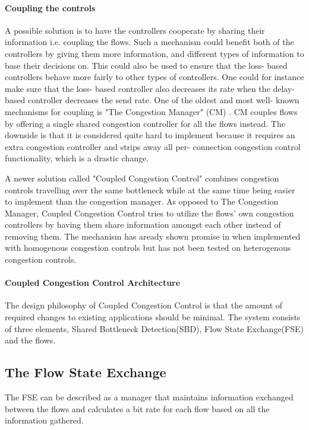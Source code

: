 \paragraph{Coupling the controls}
A possible solution is to have the controllers cooperate by sharing their information i.e. coupling the flows.
Such a mechanism could benefit both of the controllers by giving them more information, and different types of information to base their decisions on. 
This could also be used to ensure that the loss- based controllers behave more fairly to other types of controllers.
One could for instance make sure that the loss- based controller also decreases its rate when the delay- based controller decreases the send rate.
One of the oldest and most well- known mechanisms for coupling is "The Congestion Manager" (CM) \cite{rfc3124}.
CM couples flows by offering a single shared congestion controller for all the flows instead.
The downside is that it is considered quite hard to implement because it requires an extra congestion controller and strips away all per- connection congestion control functionality, which is a drastic change.

A newer solution called "Coupled Congestion Control" \cite{rfc8699} combines congestion controls travelling over the same bottleneck while at the same time being easier to implement than the congestion manager.
As opposed to The Congestion Manager, Coupled Congestion Control tries to utilize the flows' own congestion controllers by having them share information amongst each other instead of removing them. 
The mechanism has aready shown promise in \cite{10.1145/2740070.2630089, 7502803} when implemented with homogenous congestion controls but has not been tested on heterogenous congestion controls. 
\paragraph{Coupled Congestion Control Architecture}
The design philosophy of Coupled Congestion Control is that the amount of required changes to existing applications should be minimal. 
The system consists of three elements, Shared Bottleneck Detection(SBD), Flow State Exchange(FSE) and the flows. 

\subsection{The Flow State Exchange}
The FSE can be described as a manager that maintains information exchanged between the flows and calculates a bit rate for each flow based on all the information gathered. 
